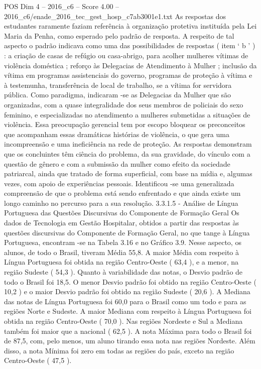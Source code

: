 \begin{textsample}{POS Dim 4 – 2016\_c6 – Score 4.00 – 2016\_c6/enade\_2016\_tec\_gest\_hosp\_c7ab3001e1.txt}
As respostas dos estudantes raramente faziam referência à organização protetiva instituída pela Lei Maria da Penha, como esperado pelo padrão de resposta.
A respeito de tal aspecto o padrão indicava como uma das possibilidades de respostas ( item ‘ b ’ ) : a criação de casas de refúgio ou casa-abrigo, para acolher mulheres vítimas de violência doméstica ; reforço às Delegacias de Atendimento à Mulher ; inclusão da vítima em programas assistenciais do governo, programas de proteção à vítima e à testemunha, transferência de local de trabalho, se a vítima for servidora pública.
Como paradigma, indicaram -se as Delegacias da Mulher que são organizadas, com a quase integralidade dos seus membros de policiais do sexo feminino, e especializadas no atendimento a mulheres submetidas a situações de violência.
Essa preocupação gerencial tem por escopo bloquear os preconceitos que acompanham essas dramáticas histórias de violência, o que gera uma incompreensão e uma ineficiência na rede de proteção.
As respostas demonstram que os concluintes têm ciência do problema, da sua gravidade, do vínculo com a questão de gênero e com a submissão da mulher como efeito da sociedade patriarcal, ainda que tratado de forma superficial, com base na mídia e, algumas vezes, com apoio de experiências pessoais.
Identificou -se uma generalizada compreensão de que o problema está sendo enfrentado e que ainda existe um longo caminho no percurso para a sua resolução. 3.3.1.5 - Análise de Língua Portuguesa das Questões Discursivas do Componente de Formação Geral Os dados de Tecnologia em Gestão Hospitalar, obtidos a partir das respostas às questões discursivas do Componente de Formação Geral, no que tange à Língua Portuguesa, encontram -se na Tabela 3.16 e no Gráfico 3.9.
Nesse aspecto, os alunos, de todo o Brasil, tiveram Média 55,8.
A maior Média com respeito à Língua Portuguesa foi obtida na região Centro-Oeste ( 63,4 ), e a menor, na região Sudeste ( 54,3 ).
Quanto à variabilidade das notas, o Desvio padrão de todo o Brasil foi 18,5.
O menor Desvio padrão foi obtido na região Centro-Oeste ( 10,2 ) e o maior Desvio padrão foi obtido na região Sudeste ( 20,6 ).
A Mediana das notas de Língua Portuguesa foi 60,0 para o Brasil como um todo e para as regiões Norte e Sudeste.
A maior Mediana com respeito à Língua Portuguesa foi obtida na região Centro-Oeste ( 70,0 ).
Nas regiões Nordeste e Sul a Mediana também foi maior que a nacional ( 62,5 ).
A nota Máxima para todo o Brasil foi de 87,5, com, pelo menos, um aluno tirando essa nota nas regiões Nordeste.
Além disso, a nota Mínima foi zero em todas as regiões do país, exceto na região Centro-Oeste ( 47,5 ).

\end{textsample}
